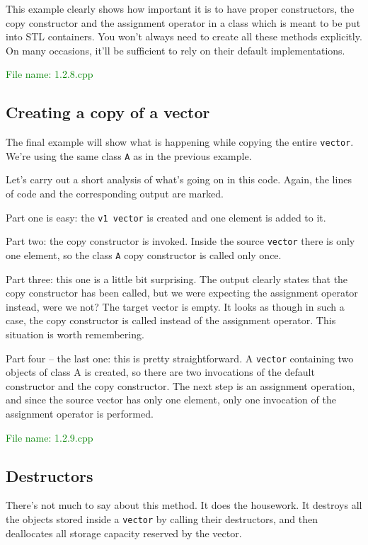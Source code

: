 This example clearly shows how important it is to have proper constructors, the copy constructor 
and the assignment operator in a class which is meant to be put into STL containers. You won’t 
always need to create all these methods explicitly. On many occasions, it’ll be sufficient to 
rely on their default implementations.

\textcolor{green}{File name: 1.2.8.cpp}


\subsection{Creating a copy of a vector} %
The final example will show what is happening while copying the entire \texttt{vector}. We’re using 
the same class \texttt{A} as in the previous example.

Let’s carry out a short analysis of what’s going on in this code. Again, the lines of code and 
the corresponding output are marked.

Part one is easy: the \texttt{v1 vector} is created and one element is added to it.

Part two: the copy constructor is invoked. Inside the source \texttt{vector} there is only one element, 
so the class \texttt{A} copy constructor is called only once.

Part three: this one is a little bit surprising. The output clearly states that the copy constructor 
has been called, but we were expecting the assignment operator instead, were we not? The target vector 
is empty. It looks as though in such a case, the copy constructor is called instead of the assignment 
operator. This situation is worth remembering.

Part four – the last one: this is pretty straightforward. A \texttt{vector} containing two objects of 
class A is created, so there are two invocations of the default constructor and the copy constructor. 
The next step is an assignment operation, and since the source vector has only one element, only one 
invocation of the assignment operator is performed.

\textcolor{green}{File name: 1.2.9.cpp}


\subsection{Destructors} %
There’s not much to say about this method. It does the housework. It destroys all the objects stored 
inside a \texttt{vector} by calling their destructors, and then deallocates all storage capacity 
reserved by the vector.

